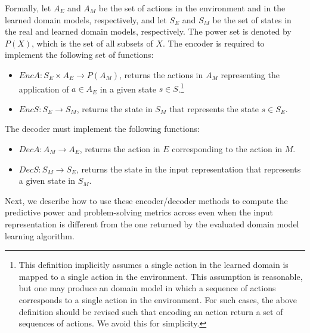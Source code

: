 \documentclass{article}
\theoremstyle{definition}
\theoremstyle{remark}
\newcommand{\encodea}{\textit{EncA}\xspace}
\newcommand{\encodes}{\textit{EncS}\xspace}
\newcommand{\decodea}{\textit{DecA}\xspace}
\newcommand{\decodes}{\textit{DecS}\xspace}
\newif\ifaddcomments
\newcommand{\roni}[1]{\ifaddcomments{\textcolor{red}{[Roni: #1]}}\fi}
\newcommand{\yarin}[1]{\ifaddcomments{\textcolor{teal}{[Yarin: #1]}}\fi}
\newcommand{\cm}[1]{\ifaddcomments{\textcolor{olive}{[Christian: #1]}}\fi}
\begin{document}
Formally, let $A_E$ and $A_M$ be the set of actions in the environment and in the learned domain models, respectively, and let $S_E$ and $S_M$ be the set of states in the real and learned domain models, respectively. The power set is denoted by $P(X)$, which is the set of all subsets of $X$. 
The encoder is required to implement the following set of functions:
\begin{itemize}
    \item $\encodea: S_E\times A_E\rightarrow P(A_M)$, returns the actions in $A_M$ representing the application of $a\in A_E$ in a given state $s \in S$.\footnote{This definition implicitly assumes a single action in the learned domain is mapped to a single action in the environment. This assumption is reasonable, but one may produce an domain model in which a sequence of actions corresponds to a single action in the environment. For such cases, the above definition should be revised such that encoding an action return a set of sequences of actions. We avoid this for simplicity.}
    \item ${\encodes: S_E\rightarrow S_M}$, returns the state in $S_M$ that represents the state $s\in S_E$. 
\end{itemize}
The decoder must implement the following functions:
\begin{itemize}
    \item ${\decodea: A_M\rightarrow A_E}$, returns the action in $E$ corresponding to the action in $M$. 
    \item ${\decodes: S_M\rightarrow S_E}$, returns the state in the input representation that represents a given state in $S_M$. 
\end{itemize}
Next, we describe how to use these encoder/decoder methods to compute the predictive power and problem-solving metrics across even when the input representation is different from the one returned by the evaluated domain model learning algorithm.




    
    
\end{document}
